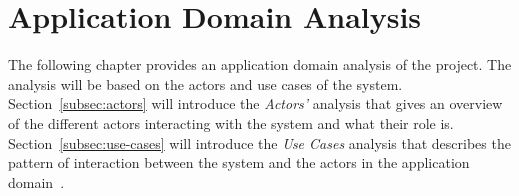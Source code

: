 \section{Application Domain Analysis}\label{sec:application-domain-analysis}

The following chapter provides an application domain analysis of the project.
The analysis will be based on the actors and use cases of the system.
Section~\ref{subsec:actors} will introduce the \textit{Actors'} analysis that gives an overview of the different actors
interacting with the system and what their role is.
Section~\ref{subsec:use-cases} will introduce the \textit{Use Cases} analysis that describes the pattern of interaction
between the system and the actors in the application domain~\cite{mathiassen2018}.




